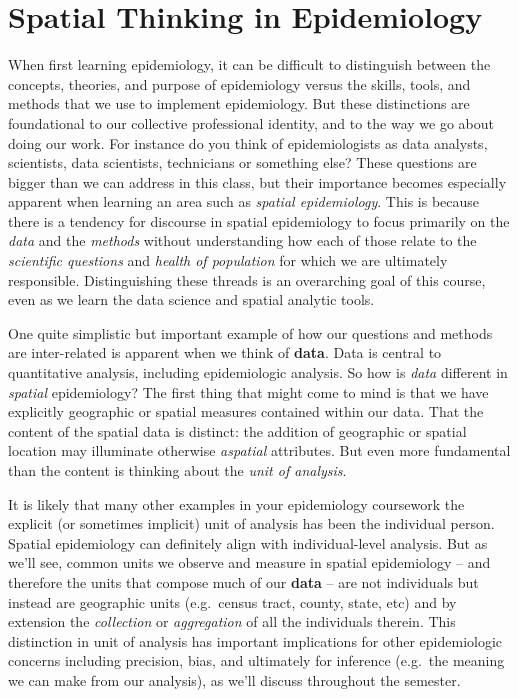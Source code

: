 \documentclass[
]{book}
\begin{document}
\hypertarget{spatial-thinking-in-epidemiology}{%
\section{Spatial Thinking in Epidemiology}\label{spatial-thinking-in-epidemiology}}

When first learning epidemiology, it can be difficult to distinguish between the concepts, theories, and purpose of epidemiology versus the skills, tools, and methods that we use to implement epidemiology. But these distinctions are foundational to our collective professional identity, and to the way we go about doing our work. For instance do you think of epidemiologists as data analysts, scientists, data scientists, technicians or something else? These questions are bigger than we can address in this class, but their importance becomes especially apparent when learning an area such as \emph{spatial epidemiology}. This is because there is a tendency for discourse in spatial epidemiology to focus primarily on the \emph{data} and the \emph{methods} without understanding how each of those relate to the \emph{scientific questions} and \emph{health of population} for which we are ultimately responsible. Distinguishing these threads is an overarching goal of this course, even as we learn the data science and spatial analytic tools.

One quite simplistic but important example of how our questions and methods are inter-related is apparent when we think of \textbf{data}. Data is central to quantitative analysis, including epidemiologic analysis. So how is \emph{data} different in \emph{spatial} epidemiology? The first thing that might come to mind is that we have explicitly geographic or spatial measures contained within our data. That the content of the spatial data is distinct: the addition of geographic or spatial location may illuminate otherwise \emph{aspatial} attributes. But even more fundamental than the content is thinking about the \emph{unit of analysis}.

It is likely that many other examples in your epidemiology coursework the explicit (or sometimes implicit) unit of analysis has been the individual person. Spatial epidemiology can definitely align with individual-level analysis. But as we'll see, common units we observe and measure in spatial epidemiology -- and therefore the units that compose much of our \textbf{data} -- are not individuals but instead are geographic units (e.g.~census tract, county, state, etc) and by extension the \emph{collection} or \emph{aggregation} of all the individuals therein. This distinction in unit of analysis has important implications for other epidemiologic concerns including precision, bias, and ultimately for inference (e.g.~the meaning we can make from our analysis), as we'll discuss throughout the semester.
\end{document}
